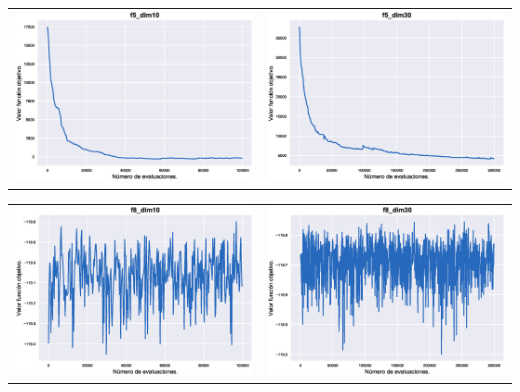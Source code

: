 \documentclass[12pt]{article}
\numberwithin{figure}{section} %
\numberwithin{table}{section} %
\begin{document}
	\begin{table}[H]
	\centering
	\begin{tabular}{ll}
	\includegraphics[width=0.5\linewidth]{./images/f5_dim10.eps} & \includegraphics[width=0.5\linewidth]{./images/f5_dim30.eps} \\
	\end{tabular}
	\end{table}

	\begin{table}[H]
	\centering
	\begin{tabular}{ll}
	\includegraphics[width=0.5\linewidth]{./images/f8_dim10.eps} & \includegraphics[width=0.5\linewidth]{./images/f8_dim30.eps} \\
	\end{tabular}
	\end{table}
\end{document}
